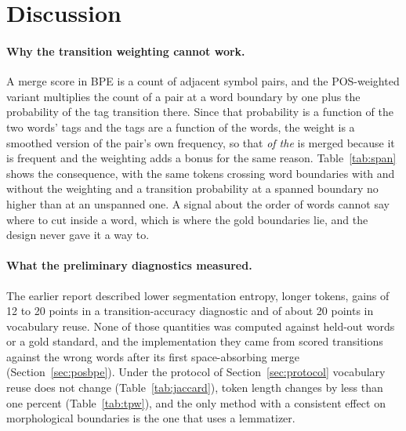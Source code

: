 \section{Discussion}\label{sec:discussion}

\paragraph{Why the transition weighting cannot work.}
A merge score in BPE is a count of adjacent symbol pairs, and the POS-weighted variant multiplies the count of a pair at a word boundary by one plus the probability of the tag transition there.
Since that probability is a function of the two words' tags and the tags are a function of the words, the weight is a smoothed version of the pair's own frequency, so that \emph{of the} is merged because it is frequent and the weighting adds a bonus for the same reason.
Table~\ref{tab:span} shows the consequence, with the same tokens crossing word boundaries with and without the weighting and a transition probability at a spanned boundary no higher than at an unspanned one.
A signal about the order of words cannot say where to cut inside a word, which is where the gold boundaries lie, and the design never gave it a way to.

\paragraph{What the preliminary diagnostics measured.}
The earlier report described lower segmentation entropy, longer tokens, gains of 12 to 20 points in a transition-accuracy diagnostic and of about 20 points in vocabulary reuse.
None of those quantities was computed against held-out words or a gold standard, and the implementation they came from scored transitions against the wrong words after its first space-absorbing merge (Section~\ref{sec:posbpe}).
Under the protocol of Section~\ref{sec:protocol} vocabulary reuse does not change (Table~\ref{tab:jaccard}), token length changes by less than one percent (Table~\ref{tab:tpw}), and the only method with a consistent effect on morphological boundaries is the one that uses a lemmatizer.

